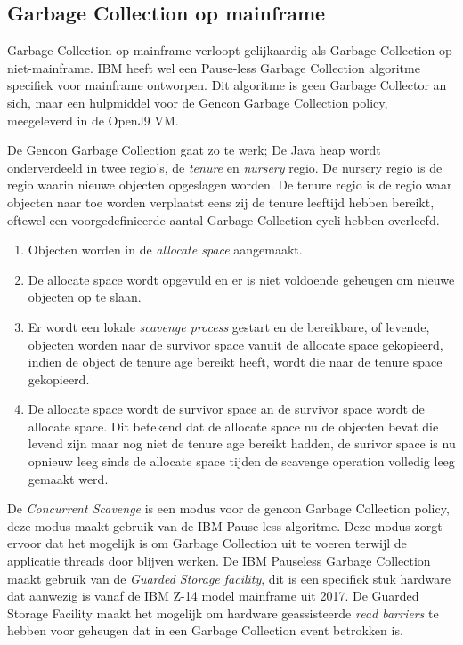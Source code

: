 \subsection{Garbage Collection op mainframe}
\label{sec:mainframe garbage collection}
Garbage Collection op mainframe verloopt gelijkaardig als Garbage Collection op niet-mainframe.
IBM heeft wel een Pause-less Garbage Collection algoritme specifiek voor mainframe ontworpen.
Dit algoritme is geen Garbage Collector an sich, maar een hulpmiddel voor de Gencon Garbage Collection policy, meegeleverd in de OpenJ9 VM.


De Gencon Garbage Collection gaat zo te werk;
De Java heap wordt onderverdeeld in twee regio's, de \textit{tenure} en \textit{nursery} regio.
De nursery regio is de regio waarin nieuwe objecten opgeslagen worden.
De tenure regio is de regio waar objecten naar toe worden verplaatst eens zij de tenure leeftijd hebben bereikt, oftewel een voorgedefinieerde aantal Garbage Collection cycli hebben overleefd. 

\begin{enumerate}
    \item Objecten worden in de \textit{allocate space} aangemaakt.
    \item De allocate space wordt opgevuld en er is niet voldoende geheugen om nieuwe objecten op te slaan.
    \item Er wordt een lokale \textit{scavenge process} gestart en de bereikbare, of levende, objecten worden naar de survivor space vanuit de allocate space gekopieerd, indien de object de tenure age bereikt heeft, wordt die naar de tenure space gekopieerd.
    \item De allocate space wordt de survivor space an de survivor space wordt de allocate space.
     Dit betekend dat de allocate space nu de objecten bevat die levend zijn maar nog niet de tenure age bereikt hadden,
     de surivor space is nu opnieuw leeg sinds de allocate space tijden de scavenge operation volledig leeg gemaakt werd.
\end{enumerate}

De \textit{Concurrent Scavenge} is een modus voor de gencon Garbage Collection policy, deze modus maakt gebruik van de IBM Pause-less algoritme. Deze modus zorgt ervoor dat het mogelijk is om Garbage Collection uit te voeren terwijl de  applicatie threads door blijven werken.
De IBM Pauseless Garbage Collection maakt gebruik van de \textit{Guarded Storage facility}, dit is een specifiek stuk hardware dat aanwezig is vanaf de IBM Z-14 model mainframe uit 2017.
De Guarded Storage Facility maakt het mogelijk om hardware geassisteerde \textit{read barriers} te hebben voor geheugen dat in een Garbage Collection event betrokken is.

